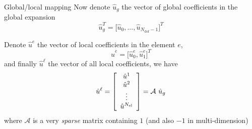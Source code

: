 \begin{frame}{Global/local mapping}
  Now denote $\hat{u}_g$ the vector of global coefficients in the global expansion
  \begin{equation}
    \label{eq:49}
    \hat{u}_g^T = \big[ \hat{u}_0, ..., \hat{u}_{N_{\text{dof}}-1} \big]^T
  \end{equation}

  Denote $\hat{u}^e$ the vector of local coefficients in the element $e$,
  \begin{equation}
    \label{eq:50}
    \hat{u}^e = \big[ \hat{u}^e_0, \hat{u}^e_1 \big]^T
  \end{equation}
  and finally $\hat{u}^\ell$ the vector of all local coefficients, we have
  \begin{equation}
    \label{eq:51}
    \hat{u}^\ell = \left[
      \begin{array}[c]{c}
        \hat{u}^1\\
        \hat{u}^2\\
        \vdots\\
        \hat{u}^{N_\text{el}}
      \end{array} \right]
    = \mathcal{A}\ \hat{u}_g
  \end{equation}
  where $\mathcal{A}$ is a very \emph{sparse} matrix containing $1$ (and also $-1$ in multi-dimension)
\end{frame}

